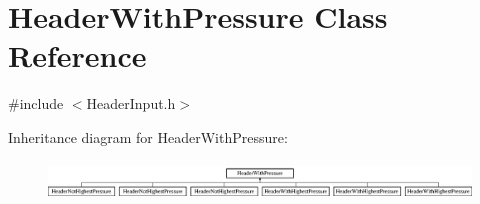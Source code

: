 \hypertarget{class_header_with_pressure}{}\section{Header\+With\+Pressure Class Reference}
\label{class_header_with_pressure}


{\ttfamily \#include $<$Header\+Input.\+h$>$}

Inheritance diagram for Header\+With\+Pressure\+:\begin{figure}[H]
\begin{center}
\leavevmode
\includegraphics[height=1.042830cm]{d0/db7/class_header_with_pressure}
\end{center}
\end{figure}
